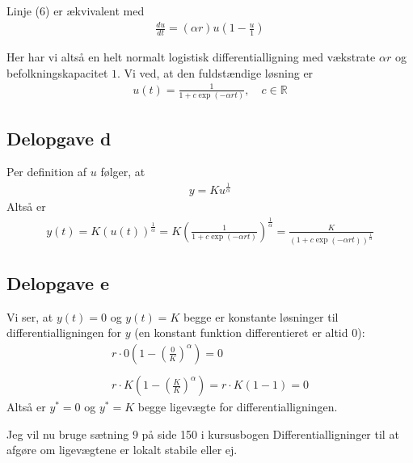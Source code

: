 \documentclass[12pt]{article}
\begin{document}
Linje (6) er ækvivalent med
\begin{align}
 \frac{du}{dt} = (\alpha r) u \left(1-\frac{u}{1}\right)
\end{align}

Her har vi altså en helt normalt logistisk differentialligning med vækstrate $\alpha r$ og befolkningskapacitet $1$. Vi ved, at den fuldstændige løsning er
\begin{align}
u(t) = \frac{1}{1+c\exp(-\alpha r t)}, \quad c\in \mathbb{R}
\end{align}

\subsection{Delopgave d}

Per definition af $u$ følger, at 
\begin{align}
y = Ku^\frac{1}{\alpha}
\end{align}
Altså er
\begin{align}
y(t)=K(u(t))^\frac{1}{\alpha} = K\left(\frac{1}{1+c\exp(-\alpha r t)}\right)^\frac{1}{\alpha} = \frac{K}{(1+c\exp(-\alpha r t))^\frac{1}{\alpha}}
\end{align}

\subsection{Delopgave e}

Vi ser, at $y(t)=0$ og $y(t)=K$ begge er konstante løsninger til differentialligningen for $y$ (en konstant funktion differentieret er altid $0$):
\begin{align}
r\cdot 0 \left(1-\left(\frac{0}{K}\right)^\alpha\right) = 0 \\ \\ 
r\cdot K \left(1-\left(\frac{K}{K}\right)^\alpha\right) = r\cdot K \left(1-1\right) = 0
\end{align}
Altså er $y^* = 0$ og $y^*=K$ begge ligevægte for differentialligningen. 

Jeg vil nu bruge sætning $9$ på side 150 i kursusbogen Differentialligninger til at afgøre om ligevægtene er lokalt stabile eller ej.
\end{document}
